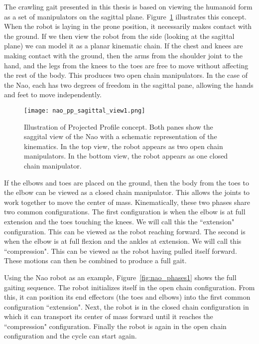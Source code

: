 The crawling gait presented in this thesis is based on viewing the humanoid form as a set of manipulators on the
sagittal plane. Figure~\ref{fig:nao_sideview1} illustrates this concept.
When the robot is laying in the prone position, it necessarily makes contact with the ground. If we then view the robot
from the side (looking at the sagittal plane) we can model it as a planar kinematic chain. If the chest and knees
are making contact with the ground, then the arms from the shoulder joint to the hand, and the legs from the knees to the
toes are free to move without affecting the rest of the body. This produces two open chain manipulators. In the case of the Nao, each has two degrees
of freedom in the sagittal pane, allowing the hands and feet to move independently.
\begin{figure}
	\centering
	\texttt{[image: nao\_pp\_sagittal\_view1.png]}
	\caption
	{Illustration of Projected Profile concept. Both panes show the saggital view of the Nao with a schematic representation of the kinematics. 
	In the top view, the robot appears as two open chain manipulators. In the bottom view, the robot appears as one closed chain manipulator.}
	\label{fig:nao_sideview1}
\end{figure}

If the elbows and toes are placed on the ground, then the body from the toes to the elbow can be viewed as a closed chain manipulator.
This allows the joints to work together to move the center of mass. Kinematically, these two phases share two common configurations.
The first configuration is when the elbow is at full extension and the toes touching the knees. We will call this the ``extension" configuration.
This can be viewed as the robot reaching forward. The second is when the elbow is at full flexion and the ankles at extension.
We will call this ``compression".
This can be viewed as the robot having pulled itself forward. These motions can then be combined
to produce a full gait.

Using the Nao robot as an example, Figure~\ref{fig:nao_phases1} shows the full gaiting sequence.
The robot initializes itself in the open chain configuration. From this, it can position
its end effectors (the toes and elbows) into the first common configuration ``extension". Next, the robot is in the closed chain 
configuration in which it can transport its center of mass forward until it reaches the ``compression" configuration. Finally the robot
is again in the open chain configuration and the cycle can start again.

